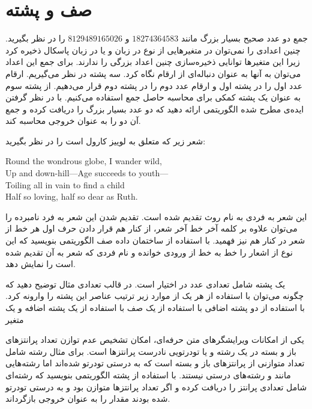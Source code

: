 \chapter{صف و پشته}

 جمع دو عدد صحیح بسیار بزرگ مانند {$18274364583$} و {$8129489165026$} را در نظر بگیرید. چنین اعدادی را نمی‌توان در متغیرهایی از نوع {} در زبان {} و یا {} در زبان پاسکال ذخیره کرد زیرا این متغیرها توانایی ذخیره‌سازی چنین اعداد بزرگی را ندارند. برای جمع این اعداد می‌توان به آنها به عنوان دنباله‌ای از ارقام نگاه کرد. سه پشته در نظر می‌گیریم. ارقام عدد اول را در پشته اول و ارقام عدد دوم را در پشته دوم قرار می‌دهیم. از پشته سوم به عنوان یک پشته کمکی برای محاسبه حاصل جمع استفاده می‌کنیم. با در نظر گرفتن ایده‌ی مطرح شده الگوریتمی ارائه دهید که دو عدد بسیار بزرگ را دریافت کرده و جمع آن دو را به عنوان خروجی محاسبه کند.

 شعر زیر که متعلق به لوییز کارول است را در نظر بگیرید:

\begin{latin}
Round the wondrous globe, I wander wild,\\
Up and down-hill---Age succeeds to youth---\\
Toiling all in vain to find a child\\
Half so loving, half so dear as Ruth.
\end{latin}

این شعر به فردی به نام روث تقدیم شده است. تقدیم شدن این شعر به فرد نامبرده را می‌توان علاوه بر کلمه آخر خط آخر شعر، از کنار هم قرار دادن حرف اول هر خط از شعر در کنار هم نیز فهمید. با استفاده از ساختمان داده صف الگوریتمی بنویسید که این نوع از اشعار را خط به خط از ورودی خوانده و نام فردی که شعر به آن تقدیم شده است را نمایش دهد.

 یک پشته شامل تعدادی عدد در اختیار است. در قالب تعدادی مثال توضیح دهید که چگونه می‌توان با استفاده از هر یک از موارد زیر ترتیب عناصر این پشته را وارونه کرد.
 با استفاده از دو پشته اضافی
 با استفاده از یک صف
 با استفاده از یک پشته اضافه و یک متغیر

 یکی از امکانات ویرایشگرهای متن حرفه‌ای، امکان تشخیص عدم توازن تعداد پرانتزهای باز و بسته در یک رشته و یا تودرتویی نادرست پرانتزها است. برای مثال رشته {} شامل تعداد متوازنی از پرانتزهای باز و بسته است که به درستی تودرتو شده‌اند اما رشته‌‌هایی مانند {} و {} رشته‌های درستی نیستند. با استفاده از پشته الگوریتمی بنویسید که رشته‌ای شامل تعدادی پرانتز را دریافت کرده و اگر تعداد پرانتزها متوازن بود و به درستی تودرتو شده بودند مقدار {} را به عنوان خروجی بازگرداند.

